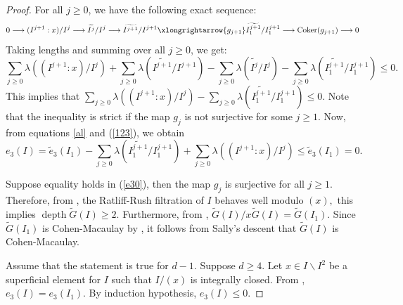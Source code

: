 \documentclass[11pt]{amsart}
\theoremstyle{plain}
\newcommand{\wt}{\widetilde}
\newcommand{\depth}{\operatorname{depth}}
\theoremstyle{plain}
\begin{document}
\begin{proof}
 For all $j\geq 0$, we have the following exact sequence: 
\begin{equation}\label{behave}
    0\longrightarrow (I^{j+1}:x)/I^j\longrightarrow  \wt{I^j}/I^j \longrightarrow  \wt{I^{j+1}}/I^{j+1} \xlongrightarrow{g_{j+1}} \wt{{I^{j+1}_1}}/{I^{j+1}_1} \longrightarrow \mathrm{Coker}(g_{j+1}) \longrightarrow 0
\end{equation}
Taking lengths and summing over all $j \geq 0$,   we get:
\begin{equation*}
    \sum_{j\geq 0}\lambda\left((I^{j+1}:x)/I^j\right)+\sum_{j\geq 0}\lambda(\wt{I^{j+1}}/I^{j+1})-\sum_{j\geq 0}\lambda(\wt{I^j}/I^j)-\sum_{j\geq 0}\lambda\left(\wt{{I^{j+1}_1}}/{I^{j+1}_1}\right) \leq 0.
\end{equation*}
This implies that $\displaystyle\sum_{j\geq 0}\lambda\left((I^{j+1}:x)/I^j\right)-\sum_{j\geq 0}\lambda\left(\wt{{I^{j+1}_1}}/{I^{j+1}_1}\right)\leq 0.$ Note that the inequality is strict if the map $g_{j}$ is not surjective for some $j\geq 1.$
 Now, from equations \eqref{al} and (\ref{123}), we obtain 
    \begin{equation} \label{e30}
        e_3(I)=\widetilde{e}_{3}({I_1})-\sum_{j\geq 0}\lambda\left(\widetilde{{I^{j+1}_1}}/{I^{j+1}_1}\right)+\sum_{j\geq 0}\lambda\left((I^{j+1}:x)/I^{j}\right)\leq \widetilde{e}_{3}({I_1})=0.
    \end{equation}
    
    Suppose equality holds in (\ref{e30}), then the map $g_j$ is surjective for all $j\geq 1.$ Therefore, from \cite[Definition 4.4]{Part2}, the Ratliff-Rush filtration of $I$ behaves well modulo $(x),$ this implies $\depth \widetilde{G}(I) \geq 2.$ Furthermore, from \cite[Remark 4.5]{Part2}, $\widetilde{G}(I)/x\widetilde{G}(I)=\widetilde{G}({I_1}).$ Since $\widetilde{G}(I_1)$ is Cohen-Macaulay by \cite[Proposition 3.4$(iv)$]{Part2}, it follows from Sally's descent that $\widetilde{G}(I)$ is Cohen-Macaulay. 

    Assume that the statement is true for $d-1.$ Suppose $d\geq 4.$ Let $x \in I\backslash I^{2}$ be a superficial element for $I$ such that $I/(x)$ is integrally closed.
    From \cite[Proposition 1.2]{rossi2010hilbert}, $e_{3}(I)=e_{3}(I_1)$. By induction hypothesis, $e_3(I)\leq 0.$ %
\end{proof}
\end{document}
